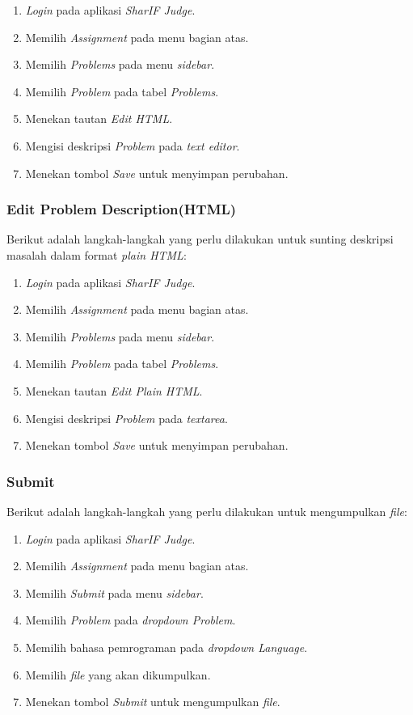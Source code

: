 \begin{enumerate}
	\item \textit{Login} pada aplikasi \textit{SharIF Judge}.
	\item Memilih \textit{Assignment} pada menu bagian atas.
	\item Memilih \textit{Problems} pada menu \textit{sidebar}.
	\item Memilih \textit{Problem} pada tabel \textit{Problems}.
	\item Menekan tautan \textit{Edit HTML}.
	\item Mengisi deskripsi \textit{Problem} pada \textit{text editor}.
	\item Menekan tombol \textit{Save} untuk menyimpan perubahan.
\end{enumerate}

\subsubsection{Edit Problem Description(HTML)}
\label{subsubsec:skenario_edit_problem_description_plain_html}
Berikut adalah langkah-langkah yang perlu dilakukan untuk sunting deskripsi masalah dalam format \textit{plain HTML}:

\begin{enumerate}
	\item \textit{Login} pada aplikasi \textit{SharIF Judge}.
	\item Memilih \textit{Assignment} pada menu bagian atas.
	\item Memilih \textit{Problems} pada menu \textit{sidebar}.
	\item Memilih \textit{Problem} pada tabel \textit{Problems}.
	\item Menekan tautan \textit{Edit Plain HTML}.
	\item Mengisi deskripsi \textit{Problem} pada \textit{textarea}.
	\item Menekan tombol \textit{Save} untuk menyimpan perubahan.
\end{enumerate}

\subsubsection{Submit}
\label{subsubsec:skenario_submit}
Berikut adalah langkah-langkah yang perlu dilakukan untuk mengumpulkan \textit{file}:

\begin{enumerate}
	\item \textit{Login} pada aplikasi \textit{SharIF Judge}.
	\item Memilih \textit{Assignment} pada menu bagian atas.
	\item Memilih \textit{Submit} pada menu \textit{sidebar}.
	\item Memilih \textit{Problem} pada \textit{dropdown Problem}.
	\item Memilih bahasa pemrograman pada \textit{dropdown Language}.
	\item Memilih \textit{file} yang akan dikumpulkan.
	\item Menekan tombol \textit{Submit} untuk mengumpulkan \textit{file}.
\end{enumerate}

